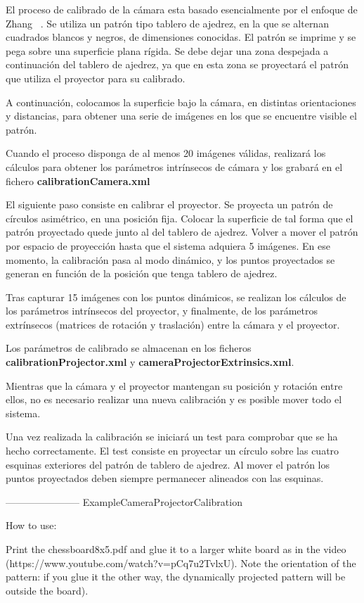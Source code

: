 El proceso de calibrado de la cámara esta basado esencialmente por el enfoque de Zhang
~\cite{Zhang}. Se utiliza un patrón tipo tablero de ajedrez, en la que se alternan
cuadrados blancos y negros, de dimensiones conocidas. El patrón se imprime y se pega sobre una
superficie plana rígida. Se debe dejar una zona despejada a continuación del tablero de ajedrez, ya
que en esta zona se proyectará el patrón que utiliza el proyector para su calibrado.

A continuación, colocamos la superficie bajo la cámara, en distintas orientaciones y distancias,
para obtener una serie de imágenes en los que se encuentre visible el patrón.

Cuando el proceso disponga de al menos 20 imágenes válidas, realizará los cálculos para obtener los
parámetros intrínsecos de cámara y los grabará en el fichero \textbf{calibrationCamera.xml}

El siguiente paso consiste en calibrar el proyector. Se proyecta un patrón de círculos asimétrico,
en una posición fija. Colocar la superficie de tal forma que el patrón proyectado quede junto al del
tablero de ajedrez. Volver a mover el patrón por espacio de proyección hasta que el sistema adquiera
5 imágenes. En ese momento, la calibración pasa al modo dinámico, y los puntos proyectados se
generan en función de la posición que tenga tablero de ajedrez.

Tras capturar 15 imágenes con los puntos dinámicos, se realizan los cálculos de los parámetros
intrínsecos del proyector, y finalmente, de los parámetros extrínsecos (matrices de rotación y
traslación) entre la cámara y el proyector.

Los parámetros de calibrado se almacenan en los ficheros \textbf{calibrationProjector.xml} y
\textbf{cameraProjectorExtrinsics.xml}.

Mientras que la cámara y el proyector mantengan su posición y rotación entre ellos, no es necesario
realizar una nueva calibración y es posible mover todo el sistema.

Una vez realizada la calibración se iniciará un test para comprobar que se ha hecho
correctamente. El test consiste en proyectar un círculo sobre las cuatro esquinas exteriores del
patrón de tablero de ajedrez. Al mover el patrón los puntos proyectados deben siempre permanecer
alineados con las esquinas.

-----------------------
ExampleCameraProjectorCalibration

How to use:

Print the chessboard8x5.pdf and glue it to a larger white board as in the video (https://www.youtube.com/watch?v=pCq7u2TvlxU). Note the orientation of the pattern: if you glue it the other way, the dynamically projected pattern will be outside the board).

